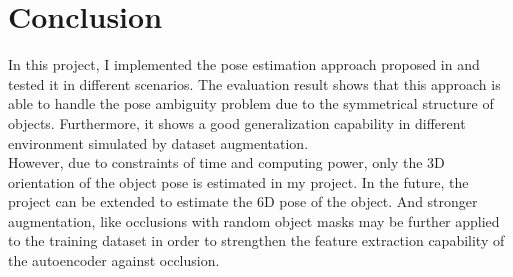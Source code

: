 \chapter{Conclusion}
In this project, I implemented the pose estimation approach proposed in \cite{sundermeyer2018implicit} and tested it in different scenarios. The evaluation result shows that this approach is able to handle the pose ambiguity problem due to the symmetrical structure of objects. Furthermore, it shows a good generalization capability in different environment simulated by dataset augmentation. 
\\[8pt]
However, due to constraints of time and computing power, only the 3D orientation of the object pose is estimated in my project. In the future, the project can be extended to estimate the 6D pose of the object. And stronger augmentation, like occlusions with random object masks may be further applied to the training dataset in order to strengthen the feature extraction capability of the autoencoder against occlusion. 